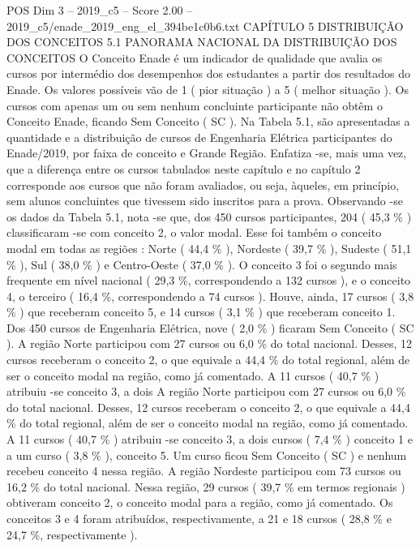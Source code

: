 \begin{textsample}{POS Dim 3 – 2019\_c5 – Score 2.00 – 2019\_c5/enade\_2019\_eng\_el\_394be1c0b6.txt}  \label{ex:f3_pos_077}
CAPÍTULO 5 DISTRIBUIÇÃO DOS CONCEITOS 5.1 PANORAMA NACIONAL DA DISTRIBUIÇÃO DOS CONCEITOS O Conceito Enade é um indicador de qualidade que avalia os cursos por intermédio dos desempenhos dos estudantes a partir dos resultados do Enade.
Os valores possíveis vão de 1 ( pior situação ) a 5 ( melhor situação ).
Os cursos com apenas um ou sem nenhum concluinte participante não obtêm o Conceito Enade, ficando Sem Conceito ( SC ).
Na Tabela 5.1, são apresentadas a quantidade e a distribuição de cursos de Engenharia Elétrica participantes do Enade/2019, por faixa de conceito e Grande Região.
Enfatiza -se, mais uma vez, que a diferença entre os cursos tabulados neste capítulo e no capítulo 2 corresponde aos cursos que não foram avaliados, ou seja, àqueles, em princípio, sem alunos concluintes que tivessem sido inscritos para a prova.
Observando -se os dados da Tabela 5.1, nota -se que, dos 450 cursos participantes, 204 ( 45,3 \% ) classificaram -se com conceito 2, o valor modal.
Esse foi também o conceito modal em todas as regiões : Norte ( 44,4 \% ), Nordeste ( 39,7 \% ), Sudeste ( 51,1 \% ), Sul ( 38,0 \% ) e Centro-Oeste ( 37,0 \% ).
O conceito 3 foi o segundo mais frequente em nível nacional ( 29,3 \%, correspondendo a 132 cursos ), e o conceito 4, o terceiro ( 16,4 \%, correspondendo a 74 cursos ).
Houve, ainda, 17 cursos ( 3,8 \% ) que receberam conceito 5, e 14 cursos ( 3,1 \% ) que receberam conceito 1.
Dos 450 cursos de Engenharia Elétrica, nove ( 2,0 \% ) ficaram Sem Conceito ( SC ).
A região Norte participou com 27 cursos ou 6,0 \% do total nacional.
Desses, 12 cursos receberam o conceito 2, o que equivale a 44,4 \% do total regional, além de ser o conceito modal na região, como já comentado.
A 11 cursos ( 40,7 \% ) atribuiu -se conceito 3, a dois A região Norte participou com 27 cursos ou 6,0 \% do total nacional.
Desses, 12 cursos receberam o conceito 2, o que equivale a 44,4 \% do total regional, além de ser o conceito modal na região, como já comentado.
A 11 cursos ( 40,7 \% ) atribuiu -se conceito 3, a dois cursos ( 7,4 \% ) conceito 1 e a um curso ( 3,8 \% ), conceito 5.
Um curso ficou Sem Conceito ( SC ) e nenhum recebeu conceito 4 nessa região.
A região Nordeste participou com 73 cursos ou 16,2 \% do total nacional.
Nessa região, 29 cursos ( 39,7 \% em termos regionais ) obtiveram conceito 2, o conceito modal para a região, como já comentado.
Os conceitos 3 e 4 foram atribuídos, respectivamente, a 21 e 18 cursos ( 28,8 \% e 24,7 \%, respectivamente ).

\end{textsample}
